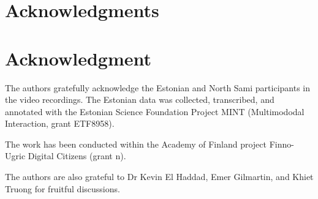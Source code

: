 \documentclass[10pt,journal,compsoc]{IEEEtran}
\begin{document}
\ifCLASSOPTIONcompsoc
  \section*{Acknowledgments}
\else
  \section*{Acknowledgment}
\fi

The authors gratefully acknowledge the Estonian and North Sami participants in the video recordings. The Estonian data was collected, transcribed, and annotated with the Estonian Science Foundation Project MINT (Multimododal Interaction, grant ETF8958).

The work has been conducted within the Academy of Finland project Finno-Ugric Digital Citizens
(grant n).

The authors are also grateful to Dr Kevin El Haddad, Emer Gilmartin, and Khiet Truong for fruitful discussions.

\ifCLASSOPTIONcaptionsoff
  \newpage
\fi






%

%

%
\end{document}
